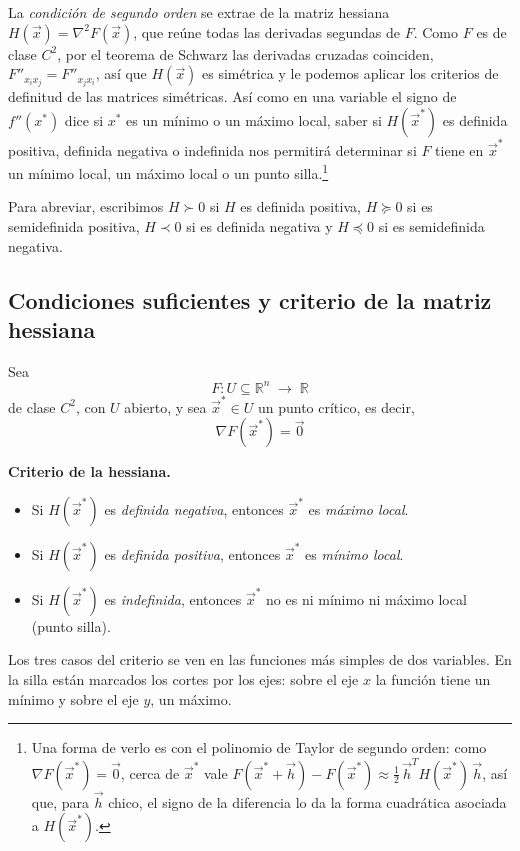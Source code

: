 \documentclass{article}
\newcommand{\R}{\ensuremath{\mathbb{R}}}
\newcommand{\vect}[1]{\vec{#1}}
\begin{document}
La \emph{condición de segundo orden} se extrae de la matriz hessiana
\(H(\vect{x})=\nabla^2 F(\vect{x})\), que reúne todas las derivadas segundas de \(F\). Como \(F\) es de clase \(C^2\), por el teorema de Schwarz las derivadas cruzadas coinciden, \(F''_{x_ix_j}=F''_{x_jx_i}\), así que \(H(\vect{x})\) es simétrica y le podemos aplicar los criterios de definitud de las matrices simétricas.
Así como en una variable el signo de \(f''(x^*)\) dice si \(x^*\) es un mínimo o un máximo local,
saber si \(H(\vect{x}^*)\) es definida positiva, definida negativa o indefinida nos permitirá determinar si \(F\) tiene en \(\vect{x}^*\) un mínimo local, un máximo local o un punto silla.\footnote{Una forma de verlo es con el polinomio de Taylor de segundo orden: como \(\nabla F(\vect{x}^*)=\vect{0}\), cerca de \(\vect{x}^*\) vale \(F(\vect{x}^*+\vect{h})-F(\vect{x}^*)\approx\tfrac12\,\vect{h}^{T}H(\vect{x}^*)\,\vect{h}\), así que, para \(\vect{h}\) chico, el signo de la diferencia lo da la forma cuadrática asociada a \(H(\vect{x}^*)\).}

Para abreviar, escribimos \(H\succ 0\) si \(H\) es definida positiva, \(H\succeq 0\) si es semidefinida positiva, \(H\prec 0\) si es definida negativa y \(H\preceq 0\) si es semidefinida negativa.


\subsection*{Condiciones suficientes y criterio de la matriz hessiana}

Sea
\[
F\colon U\subseteq\R^n\;\longrightarrow\;\R
\]
de clase \(C^2\), con \(U\) abierto, y sea \(\vect{x}^*\in U\) un punto crítico, es decir,
\[
\nabla F(\vect{x}^*) = \vect{0}
\]

\noindent\textbf{Criterio de la hessiana.}
\begin{itemize} \color{teal}
  \item Si \(H(\vect{x}^*)\) es \emph{definida negativa}, entonces \(\vect{x}^*\) es \emph{máximo local}.
  \item Si \(H(\vect{x}^*)\) es \emph{definida positiva}, entonces \(\vect{x}^*\) es \emph{mínimo local}.
  \item Si \(H(\vect{x}^*)\) es \emph{indefinida}, entonces \(\vect{x}^*\) no es ni mínimo ni máximo local (punto silla).
\end{itemize}

Los tres casos del criterio se ven en las funciones más simples de dos variables. En la silla están marcados los cortes por los ejes: sobre el eje \(x\) la función tiene un mínimo y sobre el eje \(y\), un máximo.
\end{document}
